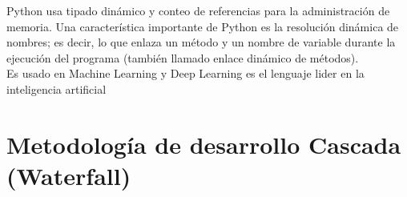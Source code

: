Python usa tipado dinámico y conteo de referencias para la administración de memoria. Una característica importante de Python es la resolución dinámica de nombres; es decir, lo que enlaza un método y un nombre de variable durante la ejecución del programa (también llamado enlace dinámico de métodos).\\

Es usado en Machine Learning y Deep Learning es el lenguaje lider en la inteligencia artificial

\section{Metodología de desarrollo Cascada (Waterfall)}